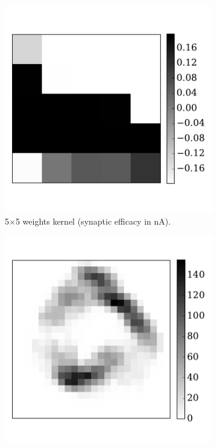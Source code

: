 \begin{figure}[htbp!]
\begin{subfigure}[t]{0.3\textwidth}
			\includegraphics[width=\textwidth]{pics_iconip/6-3.pdf}
			\caption{5$\times$5 weights kernel (synaptic efficacy in nA).}
			\label{Fig:63}
		\end{subfigure}
		\begin{subfigure}[t]{0.3\textwidth}
			\includegraphics[width=\textwidth]{pics_iconip/6-4.pdf}

\end{subfigure}
\end{figure}
